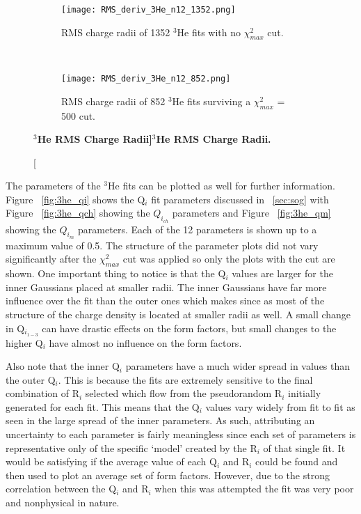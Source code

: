 \begin{figure}[!ht]
\begin{subfigure}{1.\textwidth}
  \centering
  \texttt{[image: RMS\_deriv\_3He\_n12\_1352.png]}
  \caption{RMS charge radii of 1352 $^3$He fits with no $\chi^2_{max}$ cut.}
  \label{fig:3he_rms_deriv_no_cut}
\end{subfigure}\\
\begin{subfigure}{1.\textwidth}
  \centering
  \texttt{[image: RMS\_deriv\_3He\_n12\_852.png]}
  \caption{RMS charge radii of 852 $^3$He fits surviving a $\chi^2_{max}$ = 500 cut.}
  \label{fig:3he_rms_deriv_cut}
\end{subfigure}
\caption[\bf{$^3$He RMS Charge Radii}]{\bf{$^3$He RMS Charge Radii.}}
\label{fig:3he_rms_deriv}
\end{figure}

The parameters of the $^3$He fits can be plotted as well for further information. Figure ~\ref{fig:3he_qi} shows the Q$_i$ fit parameters discussed in ~\ref{sec:sog} with Figure ~\ref{fig:3he_qch} showing the $Q_{i_{ch}}$ parameters and Figure ~\ref{fig:3he_qm} showing the $Q_{i_{m}}$ parameters. Each of the 12 parameters is shown up to a maximum value of 0.5. The structure of the parameter plots did not vary significantly after the $\chi^2_{max}$ cut was applied so only the plots with the cut are shown. One important thing to notice is that the Q$_i$ values are larger for the inner Gaussians placed at smaller radii. The inner Gaussians have far more influence over the fit than the outer ones which makes since as most of the structure of the charge density is located at smaller radii as well. A small change in Q$_{i_{1-3}}$ can have drastic effects on the form factors, but small changes to the higher Q$_i$ have almost no influence on the form factors. 

Also note that the inner Q$_i$ parameters have a much wider spread in values than the outer Q$_i$. This is because the fits are extremely sensitive to the final combination of R$_i$ selected which flow from the pseudorandom R$_i$ initially generated for each fit. This means that the Q$_i$ values vary widely from fit to fit as seen in the large spread of the inner parameters. As such, attributing an uncertainty to each parameter is fairly meaningless since each set of parameters is representative only of the specific `model' created by the R$_i$ of that single fit. It would be satisfying if the average value of each Q$_i$ and R$_i$ could be found and then used to plot an average set of form factors. However, due to the strong correlation between the Q$_i$ and R$_i$ when this was attempted the fit was very poor and nonphysical in nature.

